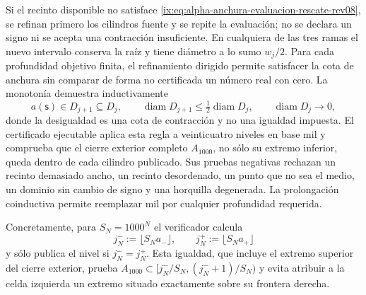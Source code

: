 Si el recinto disponible no satisface
\eqref{ix:eq:alpha-anchura-evaluacion-rescate-rev08}, se refinan primero los
cilindros fuente y se repite la evaluación; no se declara un signo ni se
acepta una contracción insuficiente. En cualquiera de las tres ramas el nuevo
intervalo conserva la raíz y tiene diámetro a lo sumo \(w_j/2\). Para cada
profundidad objetivo finita, el refinamiento dirigido permite satisfacer la
cota de anchura sin comparar de forma no certificada un número real con cero.
La monotonía demuestra inductivamente
\begin{equation}
 a(\mathsf s)\in D_{j+1}\subseteq D_j,\qquad
 \operatorname{diam}D_{j+1}\leq
 \tfrac12\operatorname{diam}D_j,
 \qquad \operatorname{diam}D_j\longrightarrow0,
 \label{ix:eq:alpha-biseccion-racional}
\end{equation}
donde la desigualdad es una cota de contracción y no una igualdad impuesta.
El certificado ejecutable aplica
esta regla a veinticuatro niveles en base mil y comprueba que el cierre
exterior completo \(A_{1000}\), no sólo su extremo inferior, queda dentro de
cada cilindro publicado. Sus pruebas negativas rechazan un recinto demasiado
ancho, un recinto desordenado, un punto que no sea el medio, un dominio sin
cambio de signo y una horquilla degenerada. La prolongación coinductiva permite
reemplazar mil por cualquier profundidad requerida.

Concretamente, para \(S_N=1000^N\) el verificador calcula
\begin{equation}
 j_N^-:=\lfloor S_Na_-\rfloor,
 \qquad j_N^+:=\lfloor S_Na_+\rfloor
 \label{ix:eq:alpha-indices-cilindro-dirigidos-rev08}
\end{equation}
y sólo publica el nivel si \(j_N^-=j_N^+\). Esta igualdad, que incluye el
extremo superior del cierre exterior, prueba
\(A_{1000}\subset[j_N^-/S_N,(j_N^-+1)/S_N)\) y evita atribuir a la celda
izquierda un extremo situado exactamente sobre su frontera derecha.

